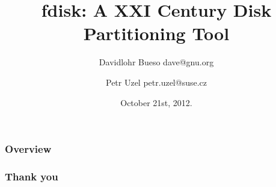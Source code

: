 \documentclass{beamer}
\begin{document}
\title{fdisk: A XXI Century Disk Partitioning Tool}
\author[]{Davidlohr Bueso dave@gnu.org \and Petr Uzel petr.uzel@suse.cz}
\date{October 21st, 2012.}

\begin{frame}
  \titlepage
\end{frame}

\begin{frame}
  \frametitle{Overview}\tableofcontents
\end{frame}






\begin{frame}\frametitle{Thank you}
\end{frame}
\end{document}
